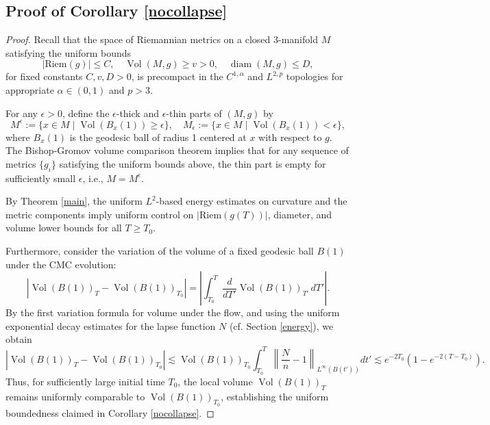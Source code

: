 \documentclass{amsart}
\begin{document}
\subsection{Proof of Corollary \ref{nocollapse}}
\label{noncollapse}
\noindent \begin{proof}
\noindent Recall that the space of Riemannian metrics on a closed 3-manifold \(M\) satisfying the uniform bounds
\[
|\mathrm{Riem}(g)| \leq C, \quad \operatorname{Vol}(M,g) \geq v > 0, \quad \operatorname{diam}(M,g) \leq D,
\]
for fixed constants \(C, v, D > 0\), is precompact in the \(C^{1,\alpha}\) and \(L^{2,p}\) topologies for appropriate \(\alpha \in (0,1)\) and \(p > 3\).

\noindent For any \(\epsilon > 0\), define the \(\epsilon\)-thick and \(\epsilon\)-thin parts of \((M,g)\) by
\[
M^{\epsilon} := \{ x \in M \mid \operatorname{Vol}(B_x(1)) \geq \epsilon \}, \quad M_{\epsilon} := \{ x \in M \mid \operatorname{Vol}(B_x(1)) < \epsilon \},
\]
where \(B_x(1)\) is the geodesic ball of radius 1 centered at \(x\) with respect to \(g\). The Bishop-Gromov volume comparison theorem \cite{bg} implies that for any sequence of metrics \(\{g_i\}\) satisfying the uniform bounds above, the thin part is empty for sufficiently small \(\epsilon\), i.e., \(M = M^{\epsilon}\).

\noindent By Theorem \ref{main}, the uniform \(L^2\)-based energy estimates on curvature and the metric components imply uniform control on \(|\mathrm{Riem}(g(T))|\), diameter, and volume lower bounds for all \(T \geq T_0\).

\noindent Furthermore, consider the variation of the volume of a fixed geodesic ball \(B(1)\) under the CMC evolution:
\[
\left| \operatorname{Vol}(B(1))_T - \operatorname{Vol}(B(1))_{T_0} \right| = \left| \int_{T_0}^T \frac{d}{dT'} \operatorname{Vol}(B(1))_{T'} \, dT' \right|.
\]
By the first variation formula for volume under the flow, and using the uniform exponential decay estimates for the lapse function \(N\) (cf. Section \ref{energy}), we obtain
\[
\left| \operatorname{Vol}(B(1))_T - \operatorname{Vol}(B(1))_{T_0} \right| \lesssim \operatorname{Vol}(B(1))_{T_0} \int_{T_0}^T \left\| \frac{N}{n} - 1 \right\|_{L^\infty(B(t'))} dt' \lesssim e^{-2T_0}(1 - e^{-2(T - T_0)}).
\]
Thus, for sufficiently large initial time \(T_0\), the local volume \(\operatorname{Vol}(B(1))_T\) remains uniformly comparable to \(\operatorname{Vol}(B(1))_{T_0}\), establishing the uniform boundedness claimed in Corollary \ref{nocollapse}.
\end{proof}
\end{document}
